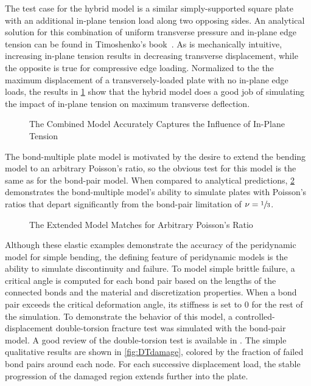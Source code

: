 \documentclass[preprint,review,12pt]{elsarticle}
\newcommand{\plotpath}{./plots}
\begin{document}
The test case for the hybrid model is a similar simply-supported square plate with an additional in-plane tension load along two opposing sides.  An analytical solution for this combination of uniform transverse pressure and in-plane edge tension can be found in Timoshenko's book~\cite{timoshenko1959theory}.  As is mechanically intuitive, increasing in-plane tension results in decreasing transverse displacement, while the opposite is true for compressive edge loading.  Normalized to the the maximum displacement of a transversely-loaded plate with no in-plane edge loads, the results in \cref{fig:plateStiffening} show that the hybrid model does a good job of simulating the impact of in-plane tension on maximum transverse deflection.
%
\begin{figure}[tbp]
  \centering
  \resizebox{0.55\linewidth}{!}{}
  \caption{The Combined Model Accurately Captures the Influence of In-Plane Tension}
  \label{fig:plateStiffening}
\end{figure}
%
The bond-multiple plate model is motivated by the desire to extend the bending model to an arbitrary Poisson's ratio, so the obvious test for this model is the same as for the bond-pair model. When compared to analytical predictions, \cref{fig:plate_poisson} demonstrates the bond-multiple model's ability to simulate plates with Poisson's ratios that depart significantly from the bond-pair limitation of $\nu = \sfrac{1}{3}$.
%
\begin{figure}[tbp]
  \centering
  \resizebox{0.55\linewidth}{!}{}
  \caption{The Extended Model Matches for Arbitrary Poisson's Ratio}
  \label{fig:plate_poisson}
\end{figure}
%

Although these elastic examples demonstrate the accuracy of the peridynamic model for simple bending, the defining feature of peridynamic models is the ability to simulate discontinuity and failure. To model simple brittle failure, a critical angle is computed for each bond pair based on the lengths of the connected bonds and the material and discretization properties. When a bond pair exceeds the critical deformation angle, its stiffness is set to 0 for the rest of the simulation. To demonstrate the behavior of this model, a controlled-displacement double-torsion fracture test was simulated with the bond-pair model. A good review of the double-torsion test is available in \cite{shyam2006double}. The simple qualitative results are shown in \cref{fig:DTdamage}, colored by the fraction of failed bond pairs around each node. For each successive displacement load, the stable progression of the damaged region extends further into the plate.
\end{document}
